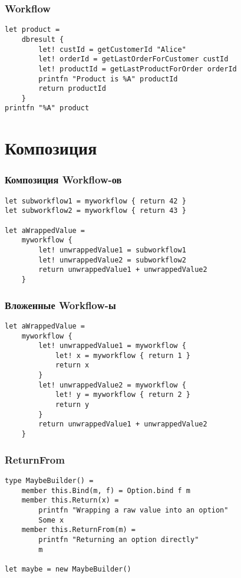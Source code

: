 \documentclass{../../slides-style}
\begin{document}
    \begin{frame}[fragile]
        \frametitle{Workflow}
        \begin{verbatim}
let product = 
    dbresult {
        let! custId = getCustomerId "Alice"
        let! orderId = getLastOrderForCustomer custId
        let! productId = getLastProductForOrder orderId 
        printfn "Product is %A" productId
        return productId
    }
printfn "%A" product
        \end{verbatim}
    \end{frame}

    \section{Композиция}

    \begin{frame}[fragile]
        \frametitle{Композиция Workflow-ов}
        \begin{verbatim}
let subworkflow1 = myworkflow { return 42 }
let subworkflow2 = myworkflow { return 43 }

let aWrappedValue = 
    myworkflow {
        let! unwrappedValue1 = subworkflow1
        let! unwrappedValue2 = subworkflow2
        return unwrappedValue1 + unwrappedValue2
    }
        \end{verbatim}
    \end{frame}

    \begin{frame}[fragile]
        \frametitle{Вложенные Workflow-ы}
        \begin{verbatim}
let aWrappedValue = 
    myworkflow {
        let! unwrappedValue1 = myworkflow {
            let! x = myworkflow { return 1 }
            return x
        }
        let! unwrappedValue2 = myworkflow {
            let! y = myworkflow { return 2 }
            return y
        }
        return unwrappedValue1 + unwrappedValue2
    }
        \end{verbatim}
    \end{frame}

    \begin{frame}[fragile]
        \frametitle{ReturnFrom}
        \begin{verbatim}
type MaybeBuilder() =
    member this.Bind(m, f) = Option.bind f m
    member this.Return(x) = 
        printfn "Wrapping a raw value into an option"
        Some x
    member this.ReturnFrom(m) = 
        printfn "Returning an option directly"
        m

let maybe = new MaybeBuilder()
        \end{verbatim}
    \end{frame}
\end{document}
